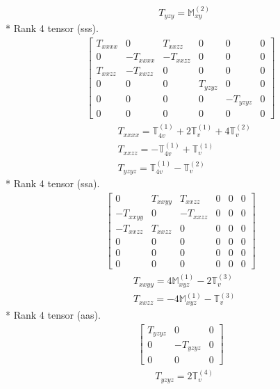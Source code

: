 \documentclass[fleqn,8pt,landscape]{jsarticle}
\begin{document}
\begin{align*}
& T_{yzy} = \mathbb{M}_{xy}^{(2)}
\end{align*}
* Rank 4 tensor (sss).
\begin{align*}
\begin{bmatrix} T_{xxxx} & 0 & T_{xxzz} & 0 & 0 & 0 \\ 0 & - T_{xxxx} & - T_{xxzz} & 0 & 0 & 0 \\ T_{xxzz} & - T_{xxzz} & 0 & 0 & 0 & 0 \\ 0 & 0 & 0 & T_{yzyz} & 0 & 0 \\ 0 & 0 & 0 & 0 & - T_{yzyz} & 0 \\ 0 & 0 & 0 & 0 & 0 & 0 \end{bmatrix}
\end{align*}
\begin{align*}
& T_{xxxx} = \mathbb{T}_{4v}^{(1)} + 2 \mathbb{T}_{v}^{(1)} + 4 \mathbb{T}_{v}^{(2)} \\
& T_{xxzz} = - \mathbb{T}_{4v}^{(1)} + \mathbb{T}_{v}^{(1)} \\
& T_{yzyz} = \mathbb{T}_{4v}^{(1)} - \mathbb{T}_{v}^{(2)}
\end{align*}
* Rank 4 tensor (ssa).
\begin{align*}
\begin{bmatrix} 0 & T_{xxyy} & T_{xxzz} & 0 & 0 & 0 \\ - T_{xxyy} & 0 & - T_{xxzz} & 0 & 0 & 0 \\ - T_{xxzz} & T_{xxzz} & 0 & 0 & 0 & 0 \\ 0 & 0 & 0 & 0 & 0 & 0 \\ 0 & 0 & 0 & 0 & 0 & 0 \\ 0 & 0 & 0 & 0 & 0 & 0 \end{bmatrix}
\end{align*}
\begin{align*}
& T_{xxyy} = 4 \mathbb{M}_{xyz}^{(1)} - 2 \mathbb{T}_{v}^{(3)} \\
& T_{xxzz} = - 4 \mathbb{M}_{xyz}^{(1)} - \mathbb{T}_{v}^{(3)}
\end{align*}
* Rank 4 tensor (aas).
\begin{align*}
\begin{bmatrix} T_{yzyz} & 0 & 0 \\ 0 & - T_{yzyz} & 0 \\ 0 & 0 & 0 \end{bmatrix}
\end{align*}
\begin{align*}
& T_{yzyz} = 2 \mathbb{T}_{v}^{(4)}
\end{align*}
\end{document}
